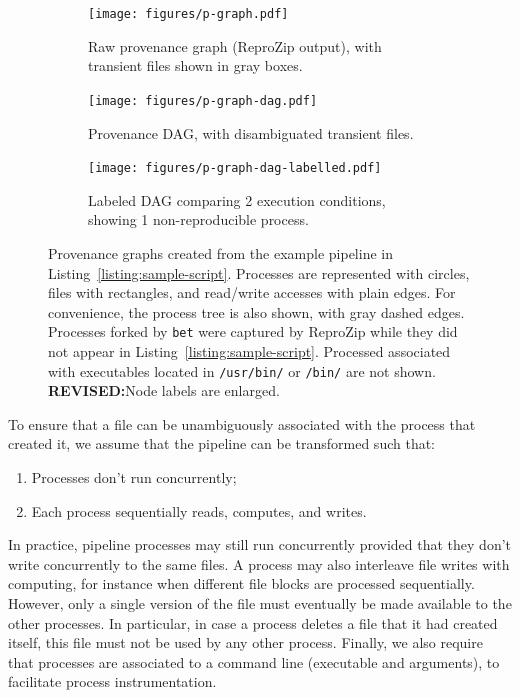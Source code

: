 \documentclass[a4paper,num-refs]{oup-contemporary}
\newcommand{\revised}[1]{\color{blue}\textbf{REVISED:}#1\color{black}}
\newcommand{\reprozip}[0]{ReproZip\xspace}
\begin{document}
\begin{figure}
  \begin{subfigure}[t]{0.3\linewidth}
    \centering
    \texttt{[image: figures/p-graph.pdf]}
    \caption{Raw provenance graph (\reprozip output), with transient files shown in gray boxes.}
    \label{fig:provenance-graph}
  \end{subfigure}
  \hfill
  \begin{subfigure}[t]{0.3\linewidth}
    \centering
    \texttt{[image: figures/p-graph-dag.pdf]}
    \caption{Provenance DAG, with disambiguated transient files.}
    \label{fig:provenance-dag}
  \end{subfigure}
  \hfill
  \begin{subfigure}[t]{0.3\linewidth}
      \centering
      \texttt{[image: figures/p-graph-dag-labelled.pdf]}
     \caption{Labeled DAG comparing 2 execution conditions, showing 1 non-reproducible process.}
     \label{fig:labeled-dag} 
  \end{subfigure}
    \caption{Provenance graphs created from the example pipeline in
    Listing~\ref{listing:sample-script}. Processes are represented with
    circles, files with rectangles, and read/write accesses with plain edges. For convenience, the process tree 
    is also shown, with gray dashed edges. Processes forked by
    \texttt{bet} were captured by \reprozip while they did not appear in
    Listing~\ref{listing:sample-script}. Processed associated with
    executables located in \texttt{/usr/bin/} or \texttt{/bin/} are not shown.
    \revised{Node labels are enlarged.}}
    \label{fig:spot-example}
  \end{figure}

To ensure that a file can be unambiguously associated with the process that
created it, we assume that the pipeline can be transformed such that:
\begin{enumerate}
\item Processes don't run concurrently;
\item Each process sequentially reads, computes, and writes. 
\end{enumerate}
In practice, pipeline processes may still run concurrently provided that
they don't write concurrently to the same files. A process may also
interleave file writes with computing, for instance when different file
blocks are processed sequentially. However, only a single version of the
file must eventually be made available to the other processes. In
particular, in case a process deletes a file that it had created itself,
this file must not be used by any other process. Finally, we also require that processes are
associated to a command line (executable and arguments), to facilitate
process instrumentation.
\end{document}
